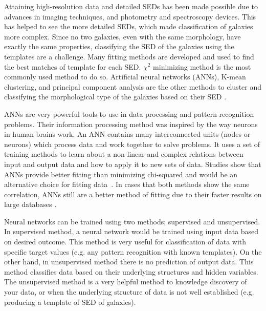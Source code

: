 \documentclass[useAMS,usenatbib]{mn2e}
\begin{document}
Attaining high-resolution data and detailed SEDs has been made possible due to advances in imaging techniques, and photometry and spectroscopy devices.
This has helped to see the more detailed SEDs, which made classification of galaxies more complex.
Since no two galaxies, even with the same morphology, have exactly the same properties, classifying the SED of the galaxies using the templates are a challenge.
Many fitting methods are developed and used to find the best matches of template for each SED.
$\chi^2$ minimizing method is the most commonly used method to do so. 
Artificial neural networks (ANNs), K-mean clustering, and principal component analysis are the other methods to cluster and classifying the morphological type of the galaxies based on their SED \citep[e.g.][]{Allen13,Ordov14,Shi15}.

ANNs are very powerful tools to use in data processing and pattern recognition problems.
Their information processing method was inspired by the way neurons in human brains work.
An ANN contains many interconnected units (nodes or neurons) which process data and work together to solve problems.
It uses a set of training methods to learn about a non-linear and complex relations between input and output data and how to apply it to new sets of data.
Studies show that ANNs provide better fitting than minimizing chi-squared and would be an alternative choice for fitting data~\citep[e.g.][]{Marquez91,Moayed09}.
In cases that both methods show the same correlation, ANNs still are a better method of fitting due to their faster results on large databases \citep[][]{Gulati97}.

Neural networks can be trained using two methods; supervised and unsupervised.
In supervised method, a neural network would be trained using input data based on desired outcome.
This method is very useful for classification of data with specific target values (e.g. any pattern recognition with known templates).
On the other hand, in unsupervised method there is no prediction of output data.
This method classifies data based on their underlying structures and hidden variables.
The unsupervised method is a very helpful method to knowledge discovery of your data, or when the underlying structure of data is not well established (e.g. producing a template of SED of galaxies).
\end{document}
